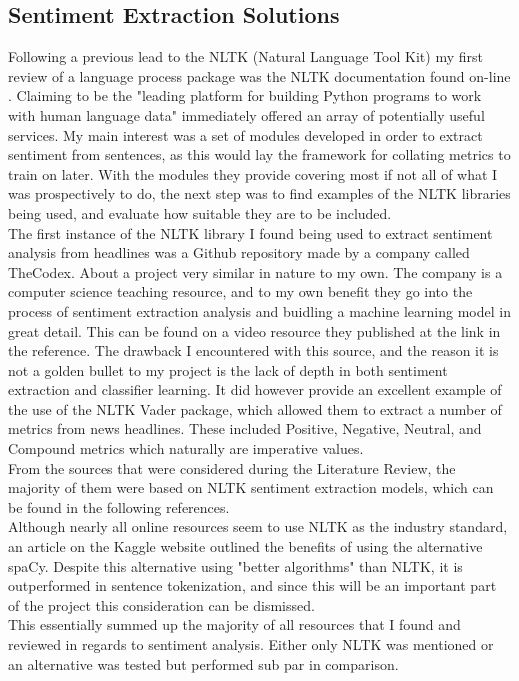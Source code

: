 \documentclass[11pt, a4paper]{article}
\begin{document}
\subsection{Sentiment Extraction Solutions}
Following a previous lead to the NLTK (Natural Language Tool Kit) my first review of a language process package was the NLTK documentation found on-line \cite{NLTK}. Claiming to be the "leading platform for building Python programs to work with human language data" immediately offered an array of potentially useful services. My main interest was a set of modules developed in order to extract sentiment from sentences, as this would lay the framework for collating metrics to train on later. With the modules they provide covering most if not all of what I was prospectively to do, the next step was to find examples of the NLTK libraries being used, and evaluate how suitable they are to be included.
\\
The first instance of the NLTK library I found being used to extract sentiment analysis from headlines was a Github repository\cite{Vader} made by a company called TheCodex. About a project very similar in nature to my own. The company is a computer science teaching resource, and to my own benefit they go into the process of sentiment extraction analysis and buidling a machine learning model in great detail. This can be found on a video resource they published at the link in the reference. The drawback I encountered with this source, and the reason it is not a golden bullet to my project is the lack of depth in both sentiment extraction and classifier learning. It did however provide an excellent example of the use of the NLTK Vader package, which allowed them to extract a number of metrics from news headlines. These included Positive, Negative, Neutral, and Compound metrics which naturally are imperative values.
\\
From the sources that were considered during the Literature Review, the majority of them were based on NLTK sentiment extraction models, which can be found in the following references\cite{Twitter}\cite{Computer Science}.
\\
Although nearly all online resources seem to use NLTK as the industry standard, an article on the Kaggle website\cite{KaggleSpace} outlined the benefits of using the alternative spaCy. Despite this alternative using "better algorithms" than NLTK, it is outperformed in sentence tokenization, and since this will be an important part of the project this consideration can be dismissed. 
\\ This essentially summed up the majority of all resources that I found and reviewed in regards to sentiment analysis. Either only NLTK was mentioned or an alternative was tested but performed sub par in comparison.
\end{document}
